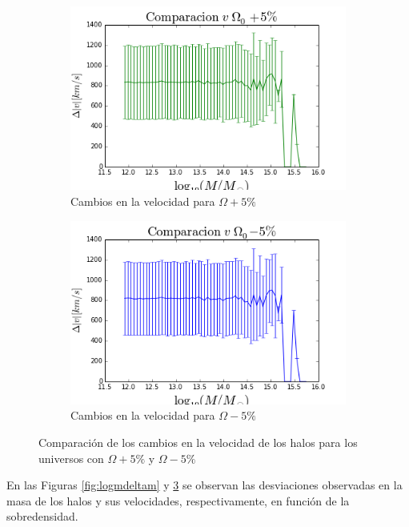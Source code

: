 \begin{figure}[h]
	\centering
	\begin{subfigure}[b]{0.49\textwidth}
		\includegraphics[width=\textwidth]{Trabajo/logm-deltav-mas}
		\caption{Cambios en la velocidad para $\Omega+5\%$}
		\label{fig:logmdeltavmas}
	\end{subfigure}
	\begin{subfigure}[b]{0.49\textwidth}
		\includegraphics[width=\textwidth]{Trabajo/logm-deltav-menos}
		\caption{Cambios en la velocidad para $\Omega-5\%$}
		\label{fig:logmdeltavmenos}
	\end{subfigure}
	\caption{Comparación de los cambios en la velocidad de los halos para los universos con $\Omega+5\%$ y $\Omega-5\%$}
	\label{fig:logmdeltav}
\end{figure}

En las Figuras \ref{fig:logmdeltam} y \ref{fig:logmdeltav} se observan las desviaciones observadas en la masa de los halos y sus velocidades, respectivamente, en función de la sobredensidad. 

